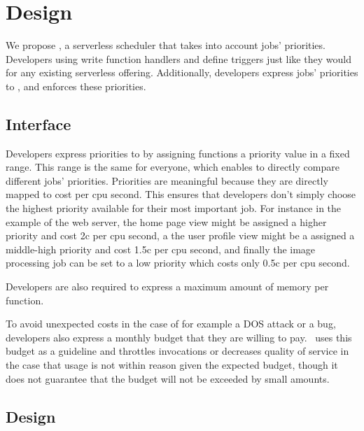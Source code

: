 \section{Design}\label{design}

We propose \sys{}, a serverless scheduler that takes into account jobs'
priorities. Developers using \sys{} write function handlers and define triggers
just like they would for any existing serverless offering. Additionally,
developers express jobs' priorities to \sys{}, and \sys{} enforces these
priorities.



\subsection{Interface}

Developers express priorities to \sys{} by assigning functions a priority value
in a fixed range. This range is the same for everyone, which enables \sys{} to
directly compare different jobs' priorities. Priorities are meaningful because
they are directly mapped to cost per cpu second. This ensures that developers
don't simply choose the highest priority available for their most important job.
For instance in the example of the web server, the home page view might be
assigned a higher priority and cost 2c per cpu second, a the user profile view
might be a assigned a middle-high priority and cost 1.5c per cpu second, and
finally the image processing job can be set to a low priority which costs only
0.5c per cpu second.

Developers are also required to express a maximum amount of memory per function.
 
To avoid unexpected costs in the case of for example a DOS attack or a bug,
developers also express a monthly budget that they are willing to pay.\ \sys{}
uses this budget as a guideline and throttles invocations or decreases quality
of service in the case that usage is not within reason given the expected
budget, though it does not guarantee that the budget will not be exceeded by
small amounts.



\subsection{\sys{} Design}

